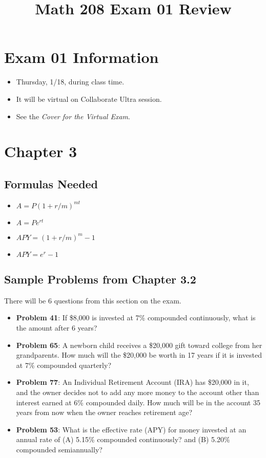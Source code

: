 \documentclass[14pt]{extarticle}
\title{\vspace{-5ex}Math 208 Exam 01 Review}
\date{\vspace{-10ex}}
\begin{document}
\maketitle

\section*{Exam 01 Information}
\begin{itemize}
	\item Thursday, 1/18, during class time.
	\item It will be virtual on Collaborate Ultra session.
	\item See the  \textit{Cover for the Virtual Exam}.
\end{itemize}	

	
\section*{Chapter 3}

\subsection*{Formulas Needed}
\begin{itemize}
	\item $A = P(1+ r/m)^{mt}$
	\item $A = Pe^{rt}$
	\item $APY = (1 + r/m)^m -1$
	\item $APY = e^r -1$
\end{itemize}

\subsection*{Sample Problems from Chapter 3.2}
There will be 6 questions from this section on the exam.
\begin{itemize}
	\item \textbf{Problem 41}: If \$8,000 is invested at 7\% compounded continuously, what is the amount after 6 years?
	\item \textbf{Problem 65}: A newborn child receives a \$20,000 gift toward college from her grandparents. How much will the \$20,000 be worth in 17 years if it is invested at 7\% compounded quarterly?
	\item \textbf{Problem 77}:  An Individual Retirement Account (IRA) has \$20,000 in it, and the owner decides not to add any more money to the account other than interest earned at 6\% compounded daily. How much will be in the account 35 years from now when the owner reaches retirement age?
	\item \textbf{Problem 53}: What is the effective rate (APY) for money invested at an annual rate of
	(A) 5.15\% compounded continuously? and (B) 5.20\% compounded semiannually?
	
\end{itemize}
\end{document}
